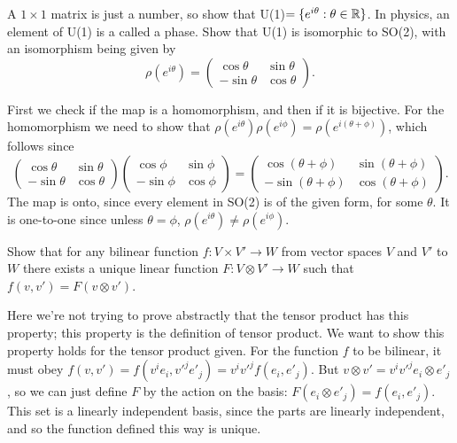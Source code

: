 \begin{p}%
{A $1\times 1$ matrix is just a number, so show that U(1)$=\{e^{i\theta}:\theta\in\mathbb{R}\}$. In physics, an element of U(1) is a called a phase. Show that U(1) is isomorphic to SO(2), with an isomorphism being given by 
\[\rho(e^{i\theta})=\left(\begin{array}{cc}\cos\theta & \sin\theta\\-\sin\theta & \cos\theta\end{array}\right).\]}
\end{p}
{First we check if the map is a homomorphism, and then if it is bijective. For the homomorphism we need
to show that $\rho(e^{i\theta})\rho(e^{i\phi})=\rho(e^{i(\theta+\phi)})$, which follows since
\[\left(\begin{array}{cc}\cos\theta & \sin\theta\\-\sin\theta & \cos\theta\end{array}\right)\left(\begin{array}{cc}\cos\phi & \sin\phi\\-\sin\phi & \cos\phi\end{array}\right)=\left(\begin{array}{cc}\cos(\theta+\phi) & \sin(\theta+\phi)\\-\sin(\theta+\phi) & \cos(\theta+\phi)\end{array}\right).\]
The map is onto, since every element in SO(2) is of the given form, for some $\theta$. It is one-to-one since
unless $\theta=\phi$, $\rho(e^{i\theta})\neq \rho(e^{i\phi})$.}

\begin{p}%
\end{p}

\begin{p}%
\end{p}

\begin{p}%
{Show that for any bilinear function $f:V\times V'\rightarrow W$ from vector spaces $V$ and $V'$ to $W$ there exists a unique linear function $F:V\otimes V'\rightarrow W$ such that $f(v,v')=F(v\otimes v')$.}
\end{p}
{
Here we're not trying to prove abstractly that the tensor product has this property; this property is the definition
of tensor product. We want to show this property holds for the tensor product given. For the function $f$ to be
bilinear, it must obey $f(v,v')=f(v^ie_i,v'^j e'_j)=v^iv'^jf(e_i,e'_j)$. But $v\otimes v'=v^iv'^je_i\otimes e'_j$, so we can just define $F$ by the action on the basis: $F(e_i\otimes e'_j)=f(e_i,e'_j)$. This set is a linearly independent basis, since the parts are linearly independent, and so the function defined this way is unique.} 

